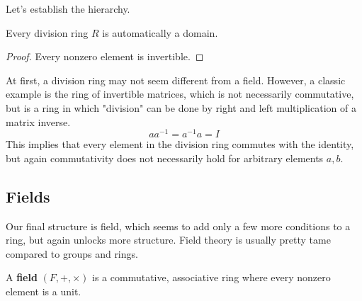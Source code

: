   Let's establish the hierarchy. 

  \begin{lemma}
    Every division ring $R$ is automatically a domain. 
  \end{lemma}
  \begin{proof}
    Every nonzero element is invertible. 
  \end{proof}

  \begin{example}
    At first, a division ring may not seem different from a field. However, a classic example is the ring of invertible matrices, which is not necessarily commutative, but is a ring in which "division" can be done by right and left multiplication of a matrix inverse. 
    \begin{equation}
      a a^{-1} = a^{-1} a = I
    \end{equation}
    This implies that every element in the division ring commutes with the identity, but again commutativity does not necessarily hold for arbitrary elements $a, b$. 
  \end{example} 

\subsection{Fields}

  Our final structure is field, which seems to add only a few more conditions to a ring, but again unlocks more structure. Field theory is usually pretty tame compared to groups and rings. 

  \begin{definition}[Field]
    A \textbf{field} $(F, +, \times)$ is a commutative, associative ring where every nonzero element is a unit. 
  \end{definition}

